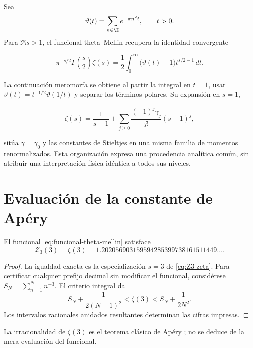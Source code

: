 Sea
\[
\vartheta(t)=\sum_{n\in\Z}e^{-\pi n^2t},\qquad t>0.
\]
Para \(\Re s>1\), el funcional theta--Mellin recupera la identidad convergente

\begin{equation}
\pi^{-s/2}\Gamma\!\left(\frac{s}{2}\right)\zeta(s)
=\frac12\int_0^\infty
\bigl(\vartheta(t)-1\bigr)t^{s/2-1}\,dt.
\label{eq:funcional-theta-mellin}
\end{equation}

La continuaci\'on meromorfa se obtiene al partir la integral en \(t=1\), usar
\(\vartheta(t)=t^{-1/2}\vartheta(1/t)\) y separar los t\'erminos polares. Su expansi\'on en \(s=1\),

\begin{equation}
\zeta(s)=\frac1{s-1}+\sum_{j\ge0}
\frac{(-1)^j\gamma_j}{j!}(s-1)^j,
\label{p3-83-c33-s2:eq:stieltjes}
\end{equation}

sit\'ua \(\gamma=\gamma_0\) y las constantes de Stieltjes en una misma
familia de momentos renormalizados. Esta organizaci\'on expresa una
procedencia anal\'itica com\'un, sin atribuir una interpretaci\'on f\'isica
id\'entica a todos sus niveles.


\section{Evaluación de la constante de Apéry}

\begin{proposition}
\label{p3-83-c33-s3:prop:evaluacion-apery}
El funcional \eqref{eq:funcional-theta-mellin} satisface
\begin{equation}
 \boxed{
 \mathcal Z_3(3)=\zeta(3)
 =1.202056903159594285399738161511449\ldots}.
\label{eq:Z3-zeta}
\end{equation}
\end{proposition}

\begin{proof}
La igualdad exacta es la especialización $s=3$ de \eqref{eq:Z3-zeta}.
Para certificar cualquier prefijo decimal sin modificar el funcional,
considérese $S_N=\sum_{n=1}^{N}n^{-3}$. El criterio integral da
\[
 S_N+\frac1{2(N+1)^2}
 <\zeta(3)<
 S_N+\frac1{2N^2}.
\]
Los intervalos racionales anidados resultantes determinan las cifras
impresas.
\end{proof}

La irracionalidad de $\zeta(3)$ es el teorema clásico de Apéry
\cite{Apery1979}; no se deduce de la mera evaluación del funcional.
